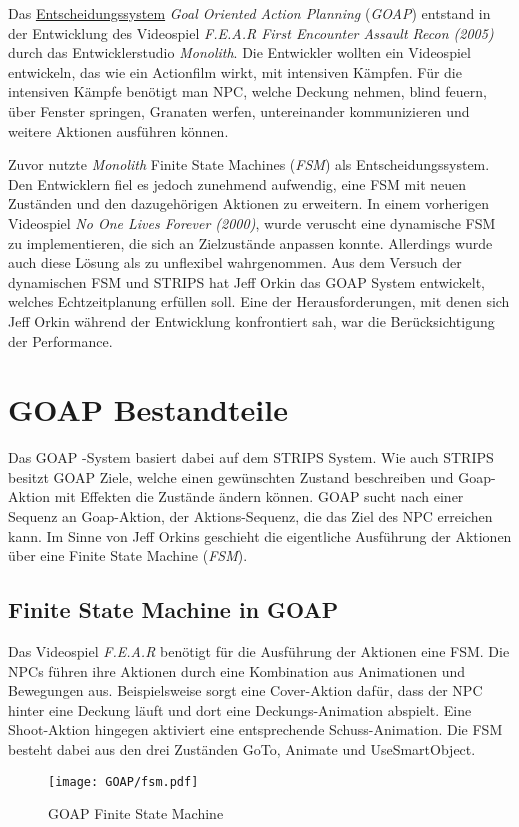 Das \hyperref[chap:entscheidungssysteme]{Entscheidungssystem} \textit{Goal Oriented Action Planning} (\textit{GOAP}) entstand in der Entwicklung des Videospiel \textit{F.E.A.R First Encounter Assault Recon (2005)} durch das Entwicklerstudio \textit{Monolith}. Die Entwickler wollten ein Videospiel entwickeln, das wie ein Actionfilm wirkt, mit intensiven Kämpfen. Für die intensiven Kämpfe benötigt man NPC, welche Deckung nehmen, blind feuern, über Fenster springen, Granaten werfen, untereinander kommunizieren und weitere Aktionen ausführen können.

Zuvor nutzte \textit{Monolith} Finite State Machines (\textit{FSM}) als Entscheidungssystem. Den Entwicklern fiel es jedoch zunehmend aufwendig, eine FSM mit neuen Zuständen und den dazugehörigen Aktionen zu erweitern. In einem vorherigen Videospiel \textit{No One Lives Forever (2000)}, wurde veruscht eine dynamische FSM zu implementieren, die sich an Zielzustände anpassen konnte. Allerdings wurde auch diese Lösung als zu unflexibel wahrgenommen. Aus dem Versuch der dynamischen FSM und STRIPS hat Jeff Orkin das GOAP System entwickelt, welches Echtzeitplanung erfüllen soll. Eine der Herausforderungen, mit denen sich Jeff Orkin während der Entwicklung konfrontiert sah, war die Berücksichtigung der Performance.\autocite{retro_fear}



\section{GOAP Bestandteile}
\label{chap:goap bestandteile}

Das GOAP -System basiert dabei auf dem STRIPS System. Wie auch STRIPS besitzt GOAP Ziele, welche einen gewünschten Zustand beschreiben und Goap-Aktion mit Effekten die Zustände ändern können. GOAP sucht nach einer Sequenz an Goap-Aktion, der Aktions-Sequenz, die das Ziel des NPC erreichen kann. Im Sinne von Jeff Orkins geschieht die eigentliche Ausführung der Aktionen über eine Finite State Machine (\textit{FSM}).


\subsection{Finite State Machine in GOAP}
\label{chap:fsm goap}

Das Videospiel \textit{F.E.A.R} benötigt für die Ausführung der Aktionen eine FSM. Die NPCs führen ihre Aktionen durch eine Kombination aus Animationen und Bewegungen aus. Beispielsweise sorgt eine Cover-Aktion dafür, dass der NPC hinter eine Deckung läuft und dort eine Deckungs-Animation abspielt. Eine Shoot-Aktion hingegen aktiviert eine entsprechende Schuss-Animation. Die FSM besteht dabei aus den drei Zuständen GoTo, Animate und UseSmartObject. 
\begin{figure}[h]
  \centering
  \texttt{[image: GOAP/fsm.pdf]}
	\captionsetup{justification=justified, format=plain}
  \caption{GOAP Finite State Machine}
  \label{fig:Goap FSM}
\end{figure}

